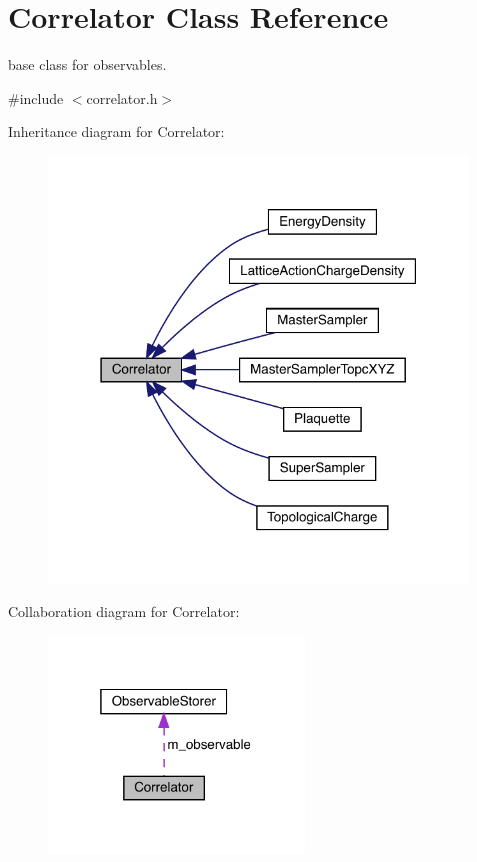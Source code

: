 \hypertarget{class_correlator}{}\section{Correlator Class Reference}
\label{class_correlator}


base class for observables.  




{\ttfamily \#include $<$correlator.\+h$>$}



Inheritance diagram for Correlator\+:
\nopagebreak
\begin{figure}[H]
\begin{center}
\leavevmode
\includegraphics[width=316pt]{class_correlator__inherit__graph}
\end{center}
\end{figure}


Collaboration diagram for Correlator\+:
\nopagebreak
\begin{figure}[H]
\begin{center}
\leavevmode
\includegraphics[width=193pt]{class_correlator__coll__graph}
\end{center}
\end{figure}
